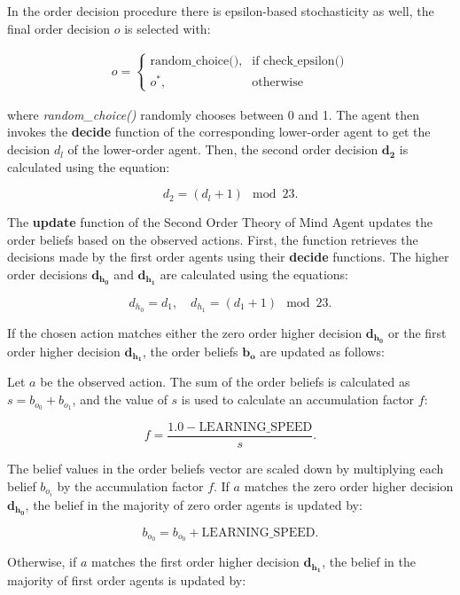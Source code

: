 In the order decision procedure there is epsilon-based stochasticity as well, the final order decision $o$ is selected with:

\[
\begin{aligned}
\text{{$o$}} =
\begin{cases}
\text{{random\_choice()}}, & \text{{if }} \text{{check\_epsilon()}} \\
o^*, & \text{{otherwise}}
\end{cases}
\end{aligned}
\]

where \textit{random\_choice()} randomly chooses between 0 and 1. The agent then invokes the \textbf{decide} function of the corresponding lower-order agent to get the decision $d_l$ of the lower-order agent. Then, the second order decision $\mathbf{d_2}$  is calculated using the equation:

\label{eq:second-order-decide}
\[
d_2 = (d_l + 1) \mod 23.
\]


The \textbf{update} function of the Second Order Theory of Mind Agent updates the order beliefs based on the observed actions. First, the function retrieves the decisions made by the first order agents using their \textbf{decide} functions. The higher order decisions $\mathbf{d_{h_0}}$ and $\mathbf{d_{h_1}}$ are calculated using the equations:

\[
d_{h_0} = d_1, \quad d_{h_1} = (d_1 + 1) \mod 23.
\]

If the chosen action matches either the zero order higher decision $\mathbf{d_{h_0}}$ or the first order higher decision $\mathbf{d_{h_1}}$, the order beliefs $\mathbf{b_o}$ are updated as follows:

Let $a$ be the observed action. The sum of the order beliefs is calculated as $s = b_{o_0} + b_{o_1}$, and the value of $s$ is used to calculate an accumulation factor $f$:

\[
f = \frac{{1.0 - \text{{LEARNING\_SPEED}}}}{s}.
\]

The belief values in the order beliefs vector are scaled down by multiplying each belief $b_{o_i}$ by the accumulation factor $f$. If $a$ matches the zero order higher decision $\mathbf{d_{h_0}}$, the belief in the majority of zero order agents is updated by:

\[
b_{o_0} = b_{o_0} + \text{{LEARNING\_SPEED}}.
\]

Otherwise, if $a$ matches the first order higher decision $\mathbf{d_{h_1}}$, the belief in the majority of first order agents is updated by:

